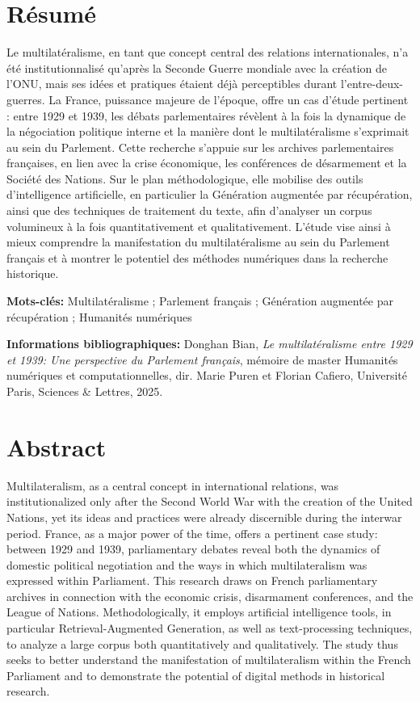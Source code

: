 \documentclass[a4paper,twoside,12pt]{book}
\begin{document}
\section*{Résumé}
Le multilatéralisme, en tant que concept central des relations internationales, n'a été institutionnalisé qu'après la Seconde Guerre mondiale avec la création de l'ONU, mais ses idées et pratiques étaient déjà perceptibles durant l'entre-deux-guerres. La France, puissance majeure de l'époque, offre un cas d'étude pertinent : entre 1929 et 1939, les débats parlementaires révèlent à la fois la dynamique de la négociation politique interne et la manière dont le multilatéralisme s'exprimait au sein du Parlement. Cette recherche s'appuie sur les archives parlementaires françaises, en lien avec la crise économique, les conférences de désarmement et la Société des Nations. Sur le plan méthodologique, elle mobilise des outils d'intelligence artificielle, en particulier la Génération augmentée par récupération, ainsi que des techniques de traitement du texte, afin d'analyser un corpus volumineux à la fois quantitativement et qualitativement. L'étude vise ainsi à mieux comprendre la manifestation du multilatéralisme au sein du Parlement français et à montrer le potentiel des méthodes numériques dans la recherche historique.

\medskip

\textbf{Mots-clés:} Multilatéralisme ; Parlement français ; Génération augmentée par récupération ; Humanités numériques

\textbf{Informations bibliographiques:} Donghan Bian, \textit{Le multilatéralisme entre 1929 et 1939:
Une perspective du Parlement français}, mémoire de master \og Humanités numériques et computationnelles\fg{}, dir. Marie Puren et Florian Cafiero, Université Paris, Sciences \& Lettres, 2025.


\section*{Abstract}
Multilateralism, as a central concept in international relations, was institutionalized only after the Second World War with the creation of the United Nations, yet its ideas and practices were already discernible during the interwar period. France, as a major power of the time, offers a pertinent case study: between 1929 and 1939, parliamentary debates reveal both the dynamics of domestic political negotiation and the ways in which multilateralism was expressed within Parliament. This research draws on French parliamentary archives in connection with the economic crisis, disarmament conferences, and the League of Nations. Methodologically, it employs artificial intelligence tools, in particular Retrieval-Augmented Generation, as well as text-processing techniques, to analyze a large corpus both quantitatively and qualitatively. The study thus seeks to better understand the manifestation of multilateralism within the French Parliament and to demonstrate the potential of digital methods in historical research.
\medskip
\end{document}
